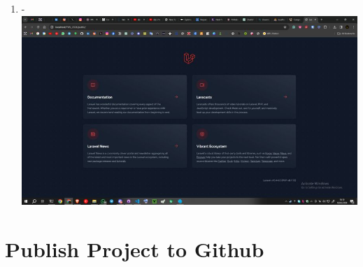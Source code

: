 \documentclass[12pt,titlepage]{article}
\begin{document}
\begin{enumerate}[label= \alph*.]
    \item - \\ \includegraphics[width=.9\textwidth]{images/figures/Laraval Init 4.jpg}
\end{enumerate}

\newpage

\section{Publish Project to Github}
\end{document}
